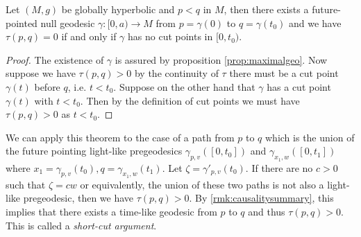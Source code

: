 \begin{theorem}
Let $(M,g)$ be globally hyperbolic and $p<q$ in $M$, then there exists a future-pointed null geodesic $\gamma:[0,a)\to M$ from $p=\gamma(0)$ to $q=\gamma(t_0)$ and we have $\tau(p,q) = 0$ if and only if $\gamma$ has no cut points in $[0,t_0)$.
\end{theorem}
\begin{proof}
The existence of $\gamma$ is assured by proposition \ref{prop:maximalgeo}. Now suppose we have $\tau(p,q)>0$ by the continuity of $\tau$ there must be a cut point $\gamma(t)$ before $q$, i.e. $t<t_0$. Suppose on the other hand that $\gamma$ has a cut point $\gamma(t)$ with $t<t_0$. Then by the definition of cut points we must have $\tau(p,q)>0$ as $t<t_0$.
\end{proof}

We can apply this theorem to the case of a path from $p$ to $q$ which is the union of the future pointing light-like pregeodesics $\gamma_{p,v}([0,t_0])$ and $\gamma_{x_1,w}([0,t_1])$ where $x_1=\gamma_{p,v}(t_0), q=\gamma_{x_1,w}(t_1)$. Let $\zeta = \gamma'_{p,v}(t_0)$. If there are no $c>0$ such that $\zeta=cw$ or equivalently, the union of these two paths is not also a light-like pregeodesic, then we have $\tau(p,q)>0$. By \ref{rmk:causalitysummary}, this implies that there exists a time-like geodesic from $p$ to $q$ and thus $\tau(p,q)>0$.
This is called a \emph{short-cut argument}.